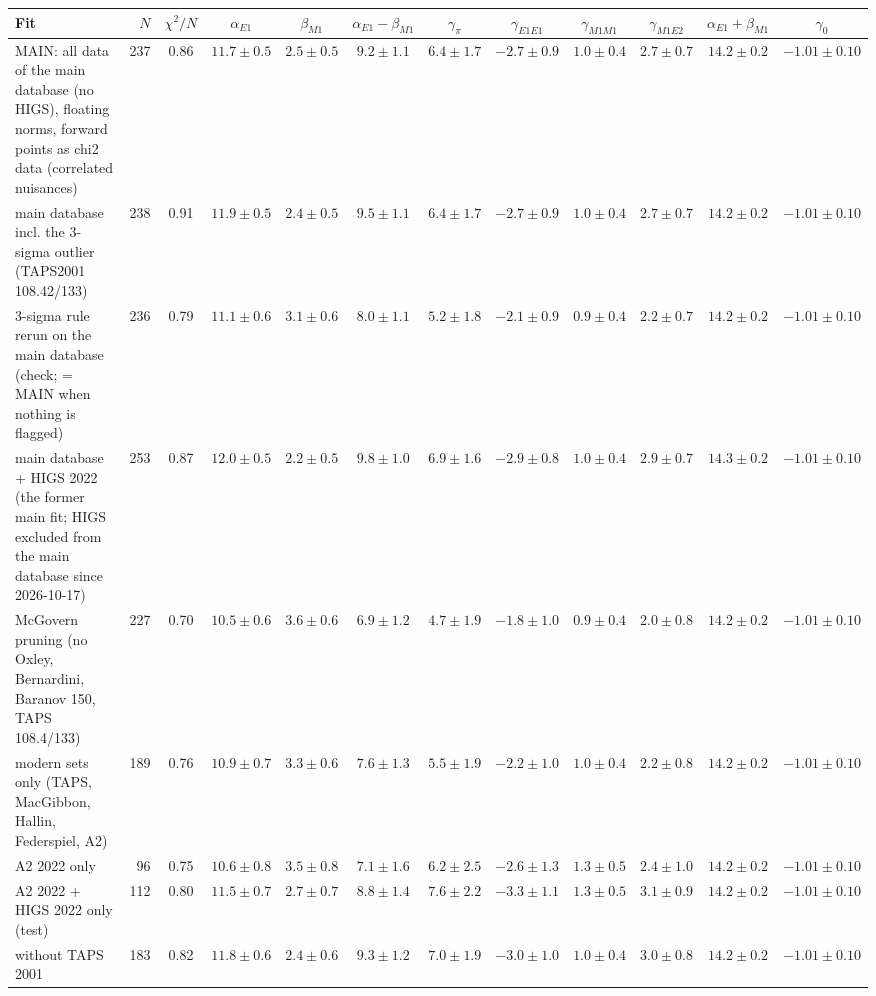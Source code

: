 \begin{tabular}{l r c cccc ccc cc}
\hline
Fit & $N$ & $\chi^2/N$ & $\alpha_{E1}$ & $\beta_{M1}$ & $\alpha_{E1}-\beta_{M1}$ & $\gamma_\pi$ & $\gamma_{E1E1}$ & $\gamma_{M1M1}$ & $\gamma_{M1E2}$ & $\alpha_{E1}+\beta_{M1}$ & $\gamma_0$\\\hline
MAIN: all data of the main database (no HIGS), floating norms, forward points as chi2 data (correlated nuisances) & 237 & 0.86 & $11.7\pm0.5$ & $2.5\pm0.5$ & $9.2\pm1.1$ & $6.4\pm1.7$ & $-2.7\pm0.9$ & $1.0\pm0.4$ & $2.7\pm0.7$ & $14.2\pm0.2$ & $-1.01\pm0.10$\\
main database incl. the 3-sigma outlier (TAPS2001 108.42/133) & 238 & 0.91 & $11.9\pm0.5$ & $2.4\pm0.5$ & $9.5\pm1.1$ & $6.4\pm1.7$ & $-2.7\pm0.9$ & $1.0\pm0.4$ & $2.7\pm0.7$ & $14.2\pm0.2$ & $-1.01\pm0.10$\\
3-sigma rule rerun on the main database (check; = MAIN when nothing is flagged) & 236 & 0.79 & $11.1\pm0.6$ & $3.1\pm0.6$ & $8.0\pm1.1$ & $5.2\pm1.8$ & $-2.1\pm0.9$ & $0.9\pm0.4$ & $2.2\pm0.7$ & $14.2\pm0.2$ & $-1.01\pm0.10$\\
main database + HIGS 2022 (the former main fit; HIGS excluded from the main database since 2026-10-17) & 253 & 0.87 & $12.0\pm0.5$ & $2.2\pm0.5$ & $9.8\pm1.0$ & $6.9\pm1.6$ & $-2.9\pm0.8$ & $1.0\pm0.4$ & $2.9\pm0.7$ & $14.3\pm0.2$ & $-1.01\pm0.10$\\
McGovern pruning (no Oxley, Bernardini, Baranov 150, TAPS 108.4/133) & 227 & 0.70 & $10.5\pm0.6$ & $3.6\pm0.6$ & $6.9\pm1.2$ & $4.7\pm1.9$ & $-1.8\pm1.0$ & $0.9\pm0.4$ & $2.0\pm0.8$ & $14.2\pm0.2$ & $-1.01\pm0.10$\\
modern sets only (TAPS, MacGibbon, Hallin, Federspiel, A2) & 189 & 0.76 & $10.9\pm0.7$ & $3.3\pm0.6$ & $7.6\pm1.3$ & $5.5\pm1.9$ & $-2.2\pm1.0$ & $1.0\pm0.4$ & $2.2\pm0.8$ & $14.2\pm0.2$ & $-1.01\pm0.10$\\
A2 2022 only & 96 & 0.75 & $10.6\pm0.8$ & $3.5\pm0.8$ & $7.1\pm1.6$ & $6.2\pm2.5$ & $-2.6\pm1.3$ & $1.3\pm0.5$ & $2.4\pm1.0$ & $14.2\pm0.2$ & $-1.01\pm0.10$\\
A2 2022 + HIGS 2022 only (test) & 112 & 0.80 & $11.5\pm0.7$ & $2.7\pm0.7$ & $8.8\pm1.4$ & $7.6\pm2.2$ & $-3.3\pm1.1$ & $1.3\pm0.5$ & $3.1\pm0.9$ & $14.2\pm0.2$ & $-1.01\pm0.10$\\
without TAPS 2001 & 183 & 0.82 & $11.8\pm0.6$ & $2.4\pm0.6$ & $9.3\pm1.2$ & $7.0\pm1.9$ & $-3.0\pm1.0$ & $1.0\pm0.4$ & $3.0\pm0.8$ & $14.2\pm0.2$ & $-1.01\pm0.10$\\

\end{tabular}
